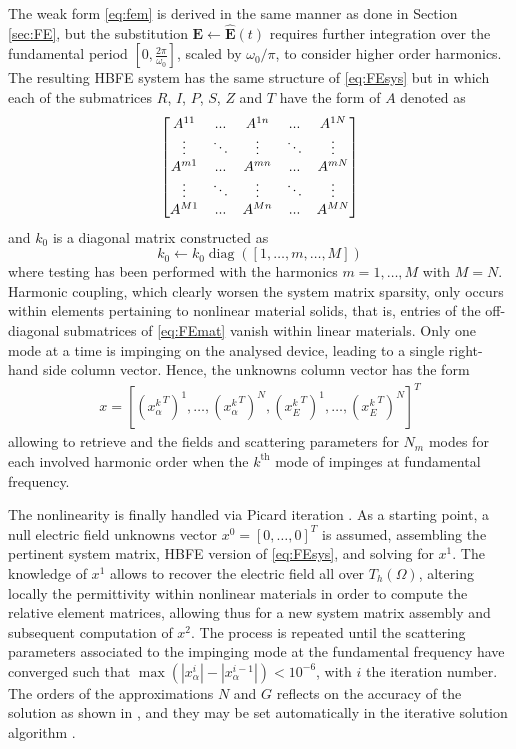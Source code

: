 \documentclass[journal,twoside,letterpaper]{IEEEtran}
\renewcommand{\vec}[1]{\mathbf{#1}}
\DeclareMathOperator{\diag}{diag}
\begin{document}
The weak form \eqref{eq:fem} is derived in the same manner as done in Section \ref{sec:FE}, but the substitution $\vec{E} \leftarrow \vec{\hat{E}}(t)$ requires further integration over the fundamental period $[0,\frac{2\pi}{\omega_0} ]$, scaled by $\omega_0/\pi$, to consider higher order harmonics. The resulting HBFE system has the same structure of \eqref{eq:FEsys} but in which each of the submatrices $R$, $I$, $P$, $S$, $Z$ and $T$ have the form of $A$ denoted as
%
\begin{equation}
\label{eq:FEmat}
\thickmuskip=0mu
\medmuskip=0mu
\thinmuskip=0mu
\begin{bmatrix}
A^{11} &\ldots &A^{1n}  &\ldots &A^{1N} \\
\vdots &\ddots &\vdots  &\ddots &\vdots \\
A^{m1} &\ldots &A^{mn}  &\ldots &A^{mN} \\
\vdots &\ddots &\vdots  &\ddots &\vdots \\
A^{M1} &\ldots &A^{Mn} &\ldots &A^{MN}
\end{bmatrix}
\end{equation}
%
\noindent and $k_0$ is a diagonal matrix constructed as
%
\begin{equation*}
k_0 \leftarrow k_0 \diag ({[1, \ldots, m, \ldots, M]})
\end{equation*}
\noindent where testing has been performed with the harmonics \mbox{$m=1,\ldots,M$} with $M=N$. Harmonic coupling, which clearly worsen the system matrix sparsity, only occurs within elements pertaining to nonlinear material solids, that is, entries of the off-diagonal submatrices of \eqref{eq:FEmat} vanish within linear materials. Only one mode at a time is impinging on the analysed device, leading to a single right-hand side column vector. Hence, the unknowns column vector has the form 
%
\begin{gather*}
x = \left[ \left({x^{k}_\alpha}^T\right)^1, \ldots,  \left({x^{k}_\alpha}^T\right)^{N},  \left({x^{k}_E}^T\right)^1, \ldots,  \left({x^{k}_E}^T\right)^N \right]^T
\end{gather*}
%
\noindent allowing to retrieve and the fields and scattering parameters for $N_m$ modes for each involved harmonic order when the $k^\text{th}$ mode of impinges at fundamental frequency.

The nonlinearity is finally handled via Picard iteration \cite{Ntibarikure2012}. As a starting point, a null electric field unknowns vector $x^0=[0,\ldots, 0]^T$ is assumed, assembling the pertinent system matrix, HBFE version of \eqref{eq:FEsys}, and solving for $x^1$. The knowledge of $x^1$ allows to recover the electric field all over $T_h(\Omega)$, altering locally the permittivity within nonlinear materials in order to compute the relative element matrices, allowing thus for a new system matrix assembly and subsequent computation of $x^2$. The process is repeated until the scattering parameters associated to the impinging mode at the fundamental frequency have converged such that $\max(|x^i_\alpha| - |x^{i-1}_\alpha|) < 10^{-6}$, with $i$ the iteration number. The orders of the approximations $N$ and $G$ reflects on the accuracy of the solution as shown in \cite{Ntibarikure2012}, and they may be set automatically in the iterative solution algorithm \cite{Gyselinck2002}.
\end{document}
